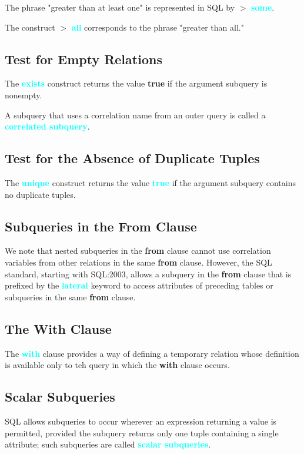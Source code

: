 \documentclass[a4paper,12pt,twoside,openany]{book}
\newcommand{\textcy}[1]{\textbf{\textcolor{cyan}{#1}}}
\begin{document}
The phrase "greater than at least one" is represented in SQL by $>$ \textcy{some}.

The construct $>$ \textcy{all} corresponds to the phrase "greater than all."

\subsection{Test for Empty Relations}

The \textcy{exists} construct returns the value \textbf{true} if the argument subquery is nonempty.

A subquery that uses a correlation name from an outer query is called a \textcy{correlated subquery}.

\subsection{Test for the Absence of Duplicate Tuples}

The \textcy{unique} construct returns the value \textcy{true} if the argument subquery contains no duplicate tuples.

\subsection{Subqueries in the From Clause}

We note that nested subqueries in the \textbf{from} clause cannot use correlation variables from other relations in the same \textbf{from} clause. However, the SQL standard, starting with SQL:2003, allows a subquery in the \textbf{from} clause that is prefixed by the \textcy{lateral} keyword to access attributes of preceding tables or subqueries in the same \textbf{from} clause.

\subsection{The With Clause}

The \textcy{with} clause provides a way of defining a temporary relation whose definition is available only to teh query in which the \textbf{with} clause occurs.

\subsection{Scalar Subqueries}

SQL allows subqueries to occur wherever an expression returning a value is permitted, provided the subquery returns only one tuple containing a single attribute; such subqueries are called \textcy{scalar subqueries}.
\end{document}
